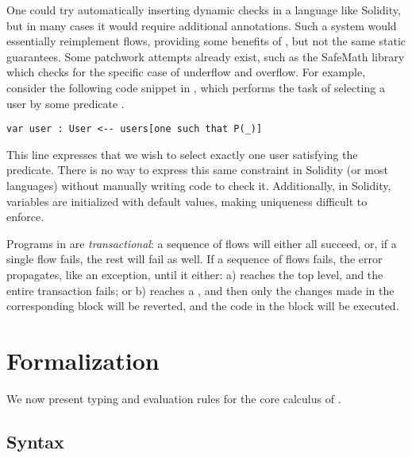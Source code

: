 \documentclass[nonacm, dvipsnames, sigconf]{acmart}
\begin{document}
One could try automatically inserting dynamic checks in a language like Solidity, but in many cases it would require additional annotations.
Such a system would essentially reimplement flows, providing some benefits of \langName, but not the same static guarantees.
Some patchwork attempts already exist, such as the SafeMath library which checks for the specific case of underflow and overflow.
For example, consider the following code snippet in \langName, which performs the task of selecting a user by some predicate .
\begin{lstlisting}[language=flow]
var user : User <-- users[one such that P(_)]
\end{lstlisting}
This line expresses that we wish to select exactly one user satisfying the predicate.
There is no way to express this same constraint in Solidity (or most languages) without manually writing code to check it.
Additionally, in Solidity, variables are initialized with default values, making uniqueness difficult to enforce.


Programs in \langName are \emph{transactional}: a sequence of flows will either all succeed, or, if a single flow fails, the rest will fail as well.
If a sequence of flows fails, the error propagates, like an exception, until it either: a) reaches the top level, and the entire transaction fails; or b) reaches a , and then only the changes made in the corresponding  block will be reverted, and the code in the  block will be executed.

\section{Formalization}

We now present typing and evaluation rules for the core calculus of \langName.

\subsection{Syntax}
\end{document}
